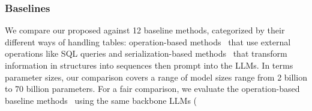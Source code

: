 \subsubsection{Baselines} We compare our proposed \name against 12 baseline methods, categorized by their different ways of handling tables: operation-based methods~\cite{rajkumar2022evaluating,dater,wang2024chainoftable} that use external operations like SQL queries and serialization-based methods~\cite{zhang2024tablellama,touvron2024llama3,gemma} that transform information in structures into sequences then prompt into the LLMs. In terms parameter sizes, our comparison covers a range of model sizes range from 2 billion to 70 billion parameters. For a fair comparison, we evaluate the operation-based baseline methods~\cite{rajkumar2022evaluating,dater,wang2024chainoftable} using the same backbone LLMs (
